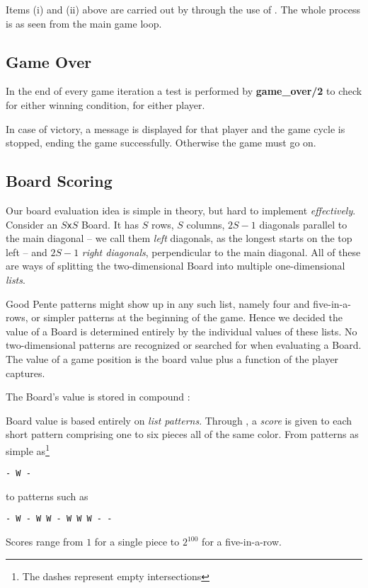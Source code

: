 \documentclass[12pt,a4paper,notitlepage]{article}
\newcommand*{\boardsize}[1]{$#1$\texttt{x}$#1$}
\begin{document}
Items (i) and (ii) above are carried out by  through the use of . The whole process is  as seen from the main game loop.

\subsection{Game Over}
\label{subsec:gameover}

In the end of every game iteration a test is performed by \textbf{game\_over/2} to check for either winning condition, for either player.

In case of victory, a message is displayed for that player and the game cycle is stopped, ending the game successfully. Otherwise the game must go on.

\subsection{Board Scoring}
\label{subsec:boardscoring}

Our board evaluation idea is simple in theory, but hard to implement \textit{effectively}. Consider an \boardsize{S} Board. It has $S$ rows, $S$ columns, $2S - 1$ diagonals parallel to the main diagonal -- we call them \textit{left} diagonals, as the longest starts on the top left -- and $2S - 1$ \textit{right diagonals}, perpendicular to the main diagonal. All of these are ways of splitting the two-dimensional Board into multiple one-dimensional \textsl{lists}.

Good Pente patterns might show up in any such list, namely four and five-in-a-rows, or simpler patterns at the beginning of the game. Hence we decided the value of a Board is determined entirely by the individual values of these lists. No two-dimensional patterns are recognized or searched for when evaluating a Board. The value of a game position is the board value plus a function of the player captures.

The Board's value is stored in compound :
\begin{center}
\end{center}

Board value is based entirely on \textit{list patterns}. Through , a \textsl{score} is given to each short pattern comprising one to six pieces all of the same color. From patterns as simple as\footnote{The dashes represent empty intersections}
\begin{center}
\tt	- W -
\end{center}
to patterns such as
\begin{center}
\tt	- W - W W - W W W - -
\end{center}
Scores range from $1$ for a single piece to $2^{100}$ for a five-in-a-row.
\end{document}
